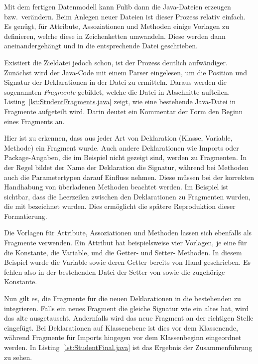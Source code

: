 Mit dem fertigen Datenmodell kann Fulib dann die Java-Dateien erzeugen bzw.\ verändern.
Beim Anlegen neuer Dateien ist dieser Prozess relativ einfach.
Es genügt, für Attribute, Assoziationen und Methoden einige Vorlagen zu definieren, welche diese in Zeichenketten umwandeln.
Diese werden dann aneinandergehängt und in die entsprechende Datei geschrieben.

Existiert die Zieldatei jedoch schon, ist der Prozess deutlich aufwändiger.
Zunächst wird der Java-Code mit einem Parser eingelesen, um die Position und Signatur der Deklarationen in der Datei zu ermitteln.
Daraus werden die sogenannten \emph{Fragmente} gebildet, welche die Datei in Abschnitte aufteilen.
Listing~\ref{lst:StudentFragments.java} zeigt, wie eine bestehende Java-Datei in Fragmente aufgeteilt wird.
Darin deutet ein Kommentar der Form  den Beginn eines Fragments an.


Hier ist zu erkennen, dass aus jeder Art von Deklaration (Klasse, Variable, Methode) ein Fragment wurde.
Auch andere Deklarationen wie Imports oder Package-Angaben, die im Beispiel nicht gezeigt sind, werden zu Fragmenten.
In der Regel bildet der Name der Deklaration die Signatur, während bei Methoden auch die Parametertypen darauf Einfluss nehmen.
Diese müssen bei der korrekten Handhabung von überladenen Methoden beachtet werden.
Im Beispiel ist sichtbar, dass die Leerzeilen zwischen den Deklarationen zu Fragmenten wurden, die mit  bezeichnet wurden.
Dies ermöglicht die spätere Reproduktion dieser Formatierung.

Die Vorlagen für Attribute, Assoziationen und Methoden lassen sich ebenfalls als Fragmente verwenden.
Ein Attribut hat beispielsweise vier Vorlagen, je eine für die Konstante, die Variable, und die Getter- und Setter- Methoden.
In diesem Beispiel wurde die Variable  sowie deren Getter bereits von Hand geschrieben.
Es fehlen also in der bestehenden Datei der Setter von  sowie die zugehörige Konstante.

Nun gilt es, die Fragmente für die neuen Deklarationen in die bestehenden zu integrieren.
Falls ein neues Fragment die gleiche Signatur wie ein altes hat, wird das alte ausgetauscht.
Andernfalls wird das neue Fragment an der richtigen Stelle eingefügt.
Bei Deklarationen auf Klassenebene ist dies vor dem Klassenende, während Fragmente für Imports hingegen vor dem Klassenbeginn eingeordnet werden.
In Listing~\ref{lst:StudentFinal.java} ist das Ergebnis der Zusammenführung zu sehen.

